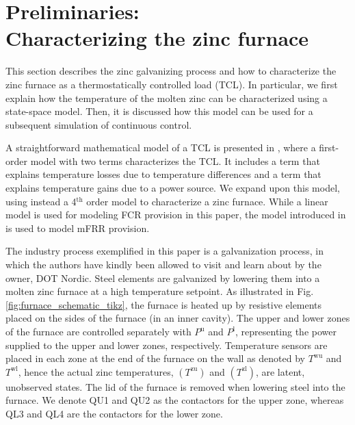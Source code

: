 \documentclass[conference]{IEEEtran}
\begin{document}
\vspace{0.5mm}
\section{Preliminaries: \\ Characterizing the zinc furnace}\label{sec:zinc_furnace_description}

\vspace{-1mm}
%
This section describes the zinc galvanizing process and how to characterize the zinc furnace as a thermostatically controlled load (TCL). In particular, we first explain how the temperature of the molten zinc can be characterized using a state-space model. Then, it is discussed how this model can be used for a subsequent simulation of continuous control. 

A straightforward mathematical model of a TCL is presented in  \cite{hao2014aggregate}, where a first-order model with two terms characterizes the TCL. It includes a term that explains temperature losses due to temperature differences and a term that explains temperature gains due to a power source. We expand upon this model, using instead a 4$^{\text{th}}$ order model to characterize a zinc furnace. While a linear model is used for modeling FCR provision in this paper, the model introduced in \cite{gade2023load} is used to model mFRR provision.


The industry process exemplified in this paper is a galvanization process, in which the authors have kindly been allowed to visit and learn about by the owner, DOT Nordic. Steel elements are galvanized by lowering them into a molten zinc furnace at a high temperature setpoint. As illustrated in Fig. \ref{fig:furnace_schematic_tikz}, the furnace is heated up by resistive elements placed on the sides of the furnace (in an inner cavity). The upper and lower zones of the furnace are controlled separately with $P^{\text{u}}$ and $P^{\text{l}}$, representing the power supplied to the upper and lower zones, respectively. Temperature sensors are placed in each zone at the end of the furnace on the wall as denoted by $T^{\text{wu}}$ and $T^{\text{wl}}$, hence the actual zinc temperatures, $(T^{\text{zu}})$ and $(T^{\text{zl}})$, are latent, unobserved states. The lid of the furnace is removed when lowering steel into the furnace. We denote QU1 and QU2 as the contactors for the upper zone, whereas QL3 and QL4 are the contactors for the lower zone.
\end{document}
